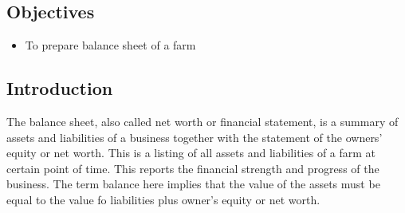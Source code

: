 \documentclass[
]{article}
\providecommand{\tightlist}{%
  \setlength{\itemsep}{0pt}\setlength{\parskip}{0pt}}
\begin{document}
\hypertarget{objectives-5}{%
\subsection*{Objectives}\label{objectives-5}}

\begin{itemize}
\tightlist
\item
  To prepare balance sheet of a farm
\end{itemize}

\hypertarget{introduction-1}{%
\subsection*{Introduction}\label{introduction-1}}

The balance sheet, also called net worth or financial statement, is a summary of assets and liabilities of a business together with the statement of the owners' equity or net worth. This is a listing of all assets and liabilities of a farm at certain point of time. This reports the financial strength and progress of the business. The term balance here implies that the value of the assets must be equal to the value fo liabilities plus owner's equity or net worth.
\end{document}
